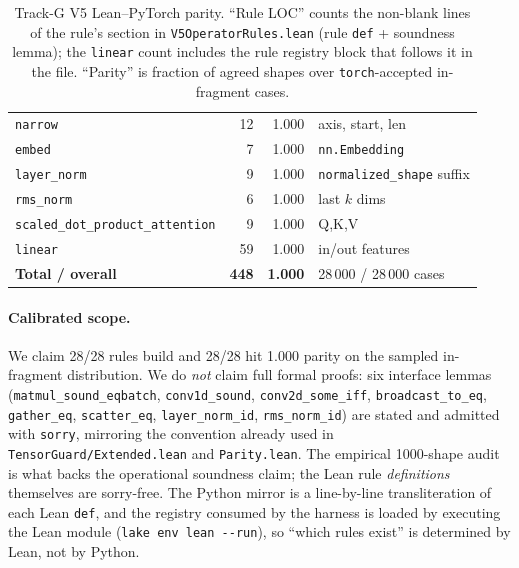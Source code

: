 \begin{table}[h]
\begin{tabular}{lrrl}
\texttt{narrow}                       & 12 & 1.000 & axis, start, len \\
\texttt{embed}                        &  7 & 1.000 & \texttt{nn.Embedding} \\
\texttt{layer\_norm}                  &  9 & 1.000 & \texttt{normalized\_shape} suffix \\
\texttt{rms\_norm}                    &  6 & 1.000 & last $k$ dims \\
\texttt{scaled\_dot\_product\_attention} & 9 & 1.000 & Q,K,V \\
\texttt{linear}                       & 59 & 1.000 & in/out features \\
\midrule
\textbf{Total / overall}              & \textbf{448} & \textbf{1.000} & 28\,000 / 28\,000 cases \\
\bottomrule
\end{tabular}
\caption{Track-G V5 Lean--PyTorch parity. ``Rule LOC'' counts the
non-blank lines of the rule's section in
\texttt{V5OperatorRules.lean} (rule \texttt{def} + soundness lemma);
the \texttt{linear} count includes the rule registry block that
follows it in the file. ``Parity'' is fraction of agreed shapes over
\texttt{torch}-accepted in-fragment cases.}
\label{tab:lean-parity-v5}
\end{table}

\paragraph{Calibrated scope.}
We claim 28/28 rules build and 28/28 hit 1.000 parity on the
sampled in-fragment distribution. We do \emph{not} claim full
formal proofs: six interface lemmas (\texttt{matmul\_sound\_eqbatch},
\texttt{conv1d\_sound}, \texttt{conv2d\_some\_iff},
\texttt{broadcast\_to\_eq}, \texttt{gather\_eq}, \texttt{scatter\_eq},
\texttt{layer\_norm\_id}, \texttt{rms\_norm\_id}) are stated and
admitted with \texttt{sorry}, mirroring the convention already used
in \texttt{TensorGuard/Extended.lean} and \texttt{Parity.lean}. The
empirical 1000-shape audit is what backs the operational soundness
claim; the Lean rule \emph{definitions} themselves are sorry-free.
The Python mirror is a line-by-line transliteration of each Lean
\texttt{def}, and the registry consumed by the harness is loaded by
executing the Lean module (\texttt{lake env lean -{}-run}), so
``which rules exist'' is determined by Lean, not by Python.
